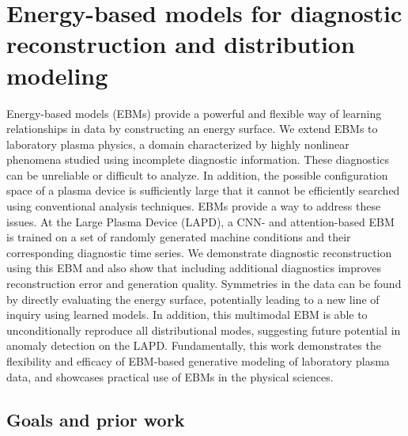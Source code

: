 \graphicspath{{Chapters/Chapter_ebm/}}

\chapter{Energy-based models for diagnostic reconstruction and distribution modeling}
\label{ch:ebm}

 Energy-based models (EBMs) provide a powerful and flexible way of learning relationships in data by constructing an energy surface. We extend EBMs to laboratory plasma physics, a domain characterized by highly nonlinear phenomena studied using incomplete diagnostic information. These diagnostics can be unreliable or difficult to analyze. In addition, the possible configuration space of a plasma device is sufficiently large that it cannot be efficiently searched using conventional analysis techniques. EBMs provide a way to address these issues. At the Large Plasma Device (LAPD), a CNN- and attention-based EBM is trained on a set of randomly generated machine conditions and their corresponding diagnostic time series. We demonstrate diagnostic reconstruction using this EBM and also show that including additional diagnostics improves reconstruction error and generation quality.
  Symmetries in the data can be found by directly evaluating the energy surface, potentially leading to a new line of inquiry using learned models. In addition, this multimodal EBM is able to unconditionally reproduce all distributional modes, suggesting future potential in anomaly detection on the LAPD. Fundamentally, this work demonstrates the flexibility and efficacy of EBM-based generative modeling of laboratory plasma data, and showcases practical use of EBMs in the physical sciences.



\section{Goals and prior work}

